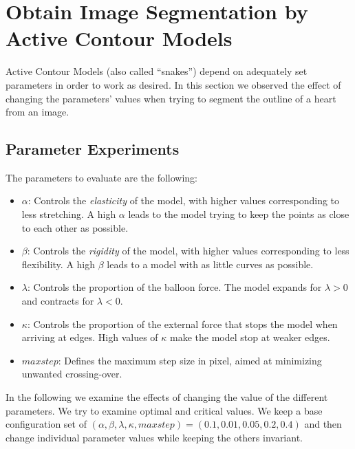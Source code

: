 \section{Obtain Image Segmentation by Active Contour Models}

Active Contour Models (also called ``snakes'') depend on adequately set parameters in order to work as desired. In this section we observed the effect of changing the parameters' values when trying to segment the outline of a heart from an image.

\subsection{Parameter Experiments}

The parameters to evaluate are the following:

\begin{itemize}

	\item $\alpha$: Controls the \textit{elasticity} of the model, with higher values corresponding to less stretching. A high $\alpha$ leads to the model trying to keep the points as close to each other as possible.
	
	\item $\beta$: Controls the \textit{rigidity} of the model, with higher values corresponding to less flexibility. A high $\beta$ leads to a model with as little curves as possible.
	
	\item $\lambda$: Controls the proportion of the balloon force. The model expands for $\lambda > 0$ and contracts for $\lambda < 0$.
	
	\item $\kappa$: Controls the proportion of the external force that stops the model when arriving at edges. High values of $\kappa$ make the model stop at weaker edges.
	
	\item $maxstep$: Defines the maximum step size in pixel, aimed at minimizing unwanted crossing-over.
	
\end{itemize}

In the following we examine the effects of changing the value of the different parameters. We try to examine optimal and critical values. We keep a base configuration set of $(\alpha , \beta , \lambda , \kappa , maxstep) = (0.1 , 0.01 , 0.05 , 0.2 , 0.4)$ and then change individual parameter values while keeping the others invariant.


